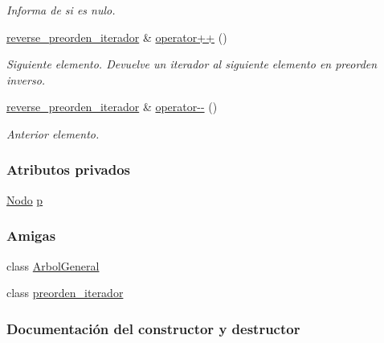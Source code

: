 \begin{DoxyCompactItemize}
\begin{DoxyCompactList}\small\item\em Informa de si es nulo. \end{DoxyCompactList}\item 
\hyperlink{classArbolGeneral_1_1reverse__preorden__iterador}{reverse\+\_\+preorden\+\_\+iterador} \& \hyperlink{classArbolGeneral_1_1reverse__preorden__iterador_a46a546c134ae2d7fe7bc41e16227eb1f}{operator++} ()
\begin{DoxyCompactList}\small\item\em Siguiente elemento.  Devuelve un iterador al siguiente elemento en preorden inverso. \end{DoxyCompactList}\item 
\hyperlink{classArbolGeneral_1_1reverse__preorden__iterador}{reverse\+\_\+preorden\+\_\+iterador} \& \hyperlink{classArbolGeneral_1_1reverse__preorden__iterador_abe501ae99cd71b927e21f882ec4bfec6}{operator-\/-\/} ()
\begin{DoxyCompactList}\small\item\em Anterior elemento. \end{DoxyCompactList}\end{DoxyCompactItemize}
\subsubsection*{Atributos privados}
\begin{DoxyCompactItemize}
\item 
\hyperlink{classArbolGeneral_a12cc1b74a9095d89bc7334290d332f7a}{Nodo} \hyperlink{classArbolGeneral_1_1reverse__preorden__iterador_a002862fdee453a84b037e5dd26c071a2}{p}
\end{DoxyCompactItemize}
\subsubsection*{Amigas}
\begin{DoxyCompactItemize}
\item 
class \hyperlink{classArbolGeneral_1_1reverse__preorden__iterador_a9c06e31b7c3e0d4ee5b03003d32935a5}{Arbol\+General}
\item 
class \hyperlink{classArbolGeneral_1_1reverse__preorden__iterador_a4aa0da8bfbc320a8daff98451ee65b6c}{preorden\+\_\+iterador}
\end{DoxyCompactItemize}


\subsubsection{Documentación del constructor y destructor}
\hypertarget{classArbolGeneral_1_1reverse__preorden__iterador_a80a523317a7f93ef2359d16048d7bd7e}{}\label{classArbolGeneral_1_1reverse__preorden__iterador_a80a523317a7f93ef2359d16048d7bd7e} 
